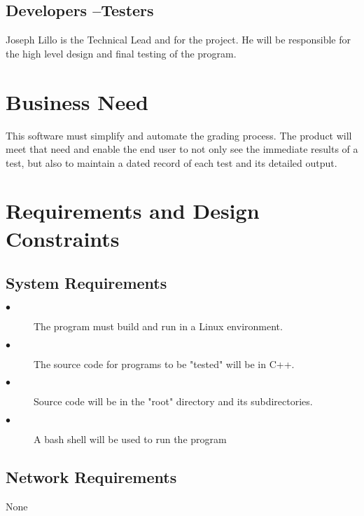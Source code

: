 \subsection{Developers --Testers}
Joseph Lillo is the Technical Lead and for the project.  He will be responsible for the high level design and final
testing of the program.

\section{Business Need}
This software must simplify and automate the grading process.  The product will meet that need and enable 
the end user to not only see the immediate results of a test, but also to maintain a dated record of each test
and its detailed output.

\section{Requirements and Design Constraints}

\subsection{System  Requirements}
\begin{description}
\item [$\bullet$] The program must build and run in a Linux environment.
\item [$\bullet$] The source code for programs to be "tested" will be in C++.
\item [$\bullet$] Source code will be in the "root" directory and its subdirectories.
\item [$\bullet$] A bash shell will be used to run the program
\end{description}

\subsection{Network Requirements}
None


